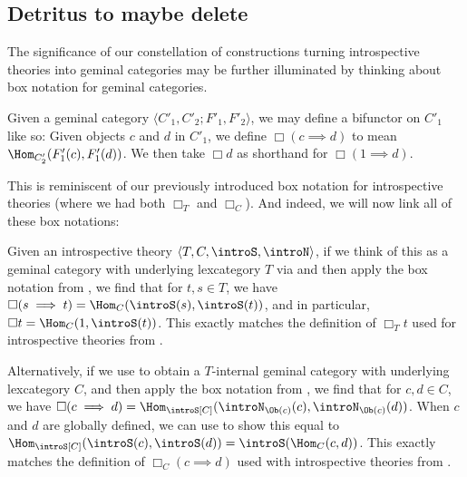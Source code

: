 

\subsection{Detritus to maybe delete}
The significance of our constellation of constructions turning introspective theories into geminal categories may be further illuminated by thinking about box notation for geminal categories.

\begin{definition}\label{BoxForGeminal}
Given a geminal category $\langle C'_1, C'_2; F'_1, F'_2 \rangle$, we may define a bifunctor on $C'_1$ like so: Given objects $c$ and $d$ in $C'_1$, we define $\Box(c \implies d)$ to mean $\Hom_{C'_2}(F'_1(c), F'_1(d))$. We then take $\Box d$ as shorthand for $\Box(1 \implies d)$.
\end{definition}

This is reminiscent of our previously introduced box notation for introspective theories (where we had both $\Box_T$ and $\Box_C$). And indeed, we will now link all of these box notations:

\begin{observation}
Given an introspective theory $\langle T, C, \introS, \introN \rangle$, if we think of this as a geminal category with underlying lexcategory $T$ via  and then apply the box notation from , we find that for $t, s \in T$, we have $\Box(s \implies t) = \Hom_C(\introS(s), \introS(t))$, and in particular, $\Box t = \Hom_C(1, \introS(t))$. This exactly matches the definition of $\Box_T t$ used for introspective theories from .

Alternatively, if we use  to obtain a $T$-internal geminal category with underlying lexcategory $C$, and then apply the box notation from , we find that for $c, d \in C$, we have $\Box(c \implies d) = \Hom_{\introS[C]}(\introN_{\Ob(c)}(c), \introN_{\Ob(c)}(d))$. When $c$ and $d$ are globally defined, we can use  to show this equal to $\Hom_{\introS[C]}(\introS(c), \introS(d)) =  \introS(\Hom_C(c, d))$. This exactly matches the definition of $\Box_C (c \implies d)$ used with introspective theories from .

\end{observation}

\fileend